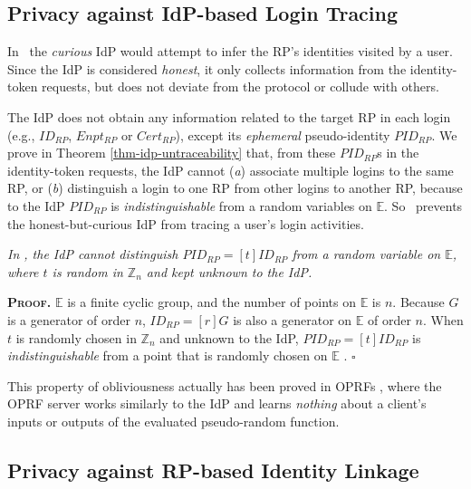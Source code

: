 \subsection{Privacy against IdP-based Login Tracing}
\label{subsec:IdP-privacy}

In \usso\ the \emph{curious} IdP would attempt to infer the RP's identities visited by a user. Since the IdP is considered \emph{honest}, it only collects information from the identity-token requests, 
 but does not deviate from the protocol or collude with others.

The IdP does not obtain any information related to the target RP in each login (e.g., $ID_{RP}$, $Enpt_{RP}$ or $Cert_{RP}$), except its \emph{ephemeral} pseudo-identity $PID_{RP}$.
We prove in Theorem \ref{thm-idp-untraceability} that, from these $PID_{RP}$s in the identity-token requests,
 the IdP cannot (\emph{a}) associate multiple logins to the same RP, or (\emph{b}) distinguish a login to one RP from other logins to another RP, because to the IdP $PID_{RP}$ is \emph{indistinguishable} from a random variables on $\mathbb{E}$. So \usso\ prevents the honest-but-curious IdP from tracing a user's login activities.

\vspace{-1.2mm}
\begin{thm}
\emph{In \usso, the IdP cannot distinguish $PID_{RP} = [t]ID_{RP}$ from a random variable on $\mathbb{E}$, where $t$ is random in $\mathbb{Z}_n$ and kept unknown to the IdP.}\label{thm-idp-untraceability}
\end{thm}
\vspace{-1.2mm}

\noindent\textbf{\textsc{Proof.}}
$\mathbb{E}$ is a finite cyclic group, and the number of points on $\mathbb{E}$ is $n$.
Because $G$ is a generator of order $n$, $ID_{RP} = [r]G$ is also a generator on $\mathbb{E}$ of order $n$.
When $t$ is randomly chosen in $\mathbb{Z}_n$ and unknown to the IdP, $PID_{RP} = [t]ID_{RP}$ is \emph{indistinguishable} from a point that is randomly chosen on $\mathbb{E}$ \cite{oprf-proved,voprf-proved}. \hfill $\square$
\vspace{.75mm}

This property of obliviousness actually has been proved in OPRFs \cite{oprf-proved,voprf-proved}, where the OPRF server works similarly to the IdP and learns \emph{nothing} about a client's inputs or outputs of the evaluated pseudo-random function.

\subsection{Privacy against RP-based Identity Linkage}
\label{subsec:RP-privacy}

